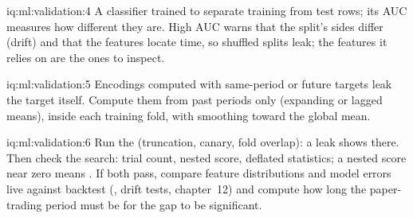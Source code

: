 \begin{solution}{iq:ml:validation:4}
A classifier trained to separate training from test rows; its AUC measures how different they are. High AUC warns that
the split's sides differ (drift) and that the features locate time, so shuffled splits leak; the features it relies on
are the ones to inspect.
\end{solution}

\begin{solution}{iq:ml:validation:5}
Encodings computed with same-period or future targets leak the target itself. Compute them from past periods only
(expanding or lagged means), inside each training fold, with smoothing toward the global mean.
\end{solution}

\begin{solution}{iq:ml:validation:6}
Run the  (truncation, canary, fold overlap): a leak shows there. Then check the search: trial count,
nested score, deflated statistics; a nested score near zero means . If both pass, compare feature
distributions and model errors live against backtest (, drift tests, chapter~12) and compute how
long the paper-trading period must be for the gap to be significant.
\end{solution}
